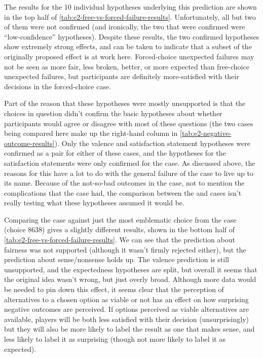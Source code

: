 The results for the 10 individual hypotheses underlying this prediction are shown in the top half of \cref{tab:e2-free-vs-forced-failure-results}.
%
Unfortunately, all but two of them were not confirmed (and ironically, the two that were confirmed were ``low-confidence'' hypotheses).
%
Despite these results, the two confirmed hypotheses show extremely strong effects, and can be taken to indicate that a subset of the originally proposed effect is at work here.
%
Forced-choice unexpected failures may not be seen as more fair, less broken, better, or more expected than free-choice unexpected failures, but participants are definitely more-satisfied with their decisions in the forced-choice case.


Part of the reason that these hypotheses were mostly unsupported is that the choices in question didn't confirm the basic hypotheses about whether participants would agree or disagree with most of these questions (the two cases being compared here make up the right-hand column in \cref{tab:e2-negative-outcome-results}).
%
Only the valence and satisfaction statement hypotheses were confirmed as a pair for either of these cases, and the hypotheses for the satisfaction statements were only confirmed for the \unxf{} case.
%
As discussed above, the reasons for this have a lot to do with the general failure of the \obvfm{} case to live up to its name.
%
Because of the not-so-bad outcomes in the \obvfm{} case, not to mention the complications that the \unxf{} case had, the comparison between the \unxf{} and \obvfm{} cases isn't really testing what these hypotheses assumed it would be.


Comparing the \unxf{} case against just the most emblematic choice from the \obvfm{} case (choice 8638) gives a slightly different results, shown in the bottom half of \cref{tab:e2-free-vs-forced-failure-results}.
%
We can see that the prediction about fairness was not supported (although it wasn't firmly rejected either), but the prediction about sense/nonsense holds up.
%
The valence prediction is still unsupported, and the expectedness hypotheses are split, but overall it seems that the original idea wasn't wrong, but just overly broad.
%
Although more data would be needed to pin down this effect, it seems clear that the perception of alternatives to a chosen option as viable or not has an effect on how surprising negative outcomes are perceived.
%
If options perceived as viable alternatives are available, players will be both less satisfied with their decision (unsurprisingly) but they will also be more likely to label the result as one that makes sense, and less likely to label it as surprising (though not more likely to label it as expected).


